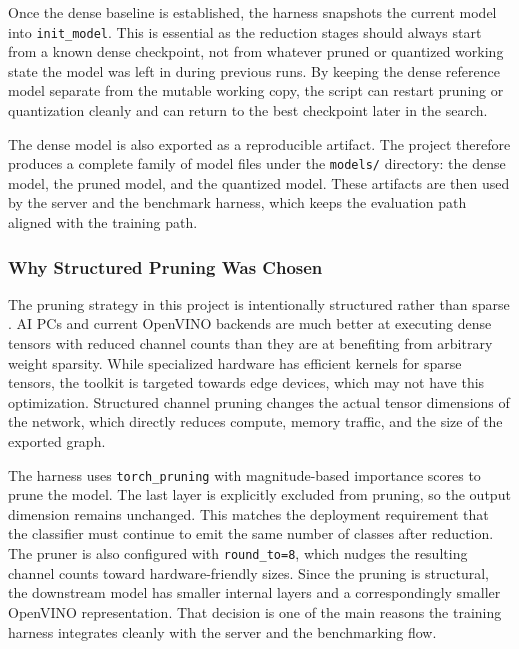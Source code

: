 \documentclass[conference]{IEEEtran}
\begin{document}
Once the dense baseline is established, the harness snapshots the current model into \texttt{init\_model}. This is essential as the reduction stages should always start from a known dense checkpoint, not from whatever pruned or quantized working state the model was left in during previous runs. By keeping the dense reference model separate from the mutable working copy, the script can restart pruning or quantization cleanly and can return to the best checkpoint later in the search.

The dense model is also exported as a reproducible artifact. The project therefore produces a complete family of model files under the \texttt{models/} directory: the dense model, the pruned model, and the quantized model. These artifacts are then used by the server and the benchmark harness, which keeps the evaluation path aligned with the training path.

\subsubsection{Why Structured Pruning Was Chosen}
The pruning strategy in this project is intentionally structured rather than sparse \cite{han2015learning,li2017pruning,he2017channel,molchanov2017pruning,liu2017network,luo2017thinet}. AI PCs and current OpenVINO backends are much better at executing dense tensors with reduced channel counts than they are at benefiting from arbitrary weight sparsity. While specialized hardware has efficient kernels for sparse tensors, the toolkit is targeted towards edge devices, which may not have this optimization. Structured channel pruning changes the actual tensor dimensions of the network, which directly reduces compute, memory traffic, and the size of the exported graph.

The harness uses \texttt{torch\_pruning} with magnitude-based importance scores to prune the model. The last layer is explicitly excluded from pruning, so the output dimension remains unchanged. This matches the deployment requirement that the classifier must continue to emit the same number of classes after reduction. The pruner is also configured with \texttt{round\_to=8}, which nudges the resulting channel counts toward hardware-friendly sizes. Since the pruning is structural, the downstream model has smaller internal layers and a correspondingly smaller OpenVINO representation. That decision is one of the main reasons the training harness integrates cleanly with the server and the benchmarking flow.
\end{document}
